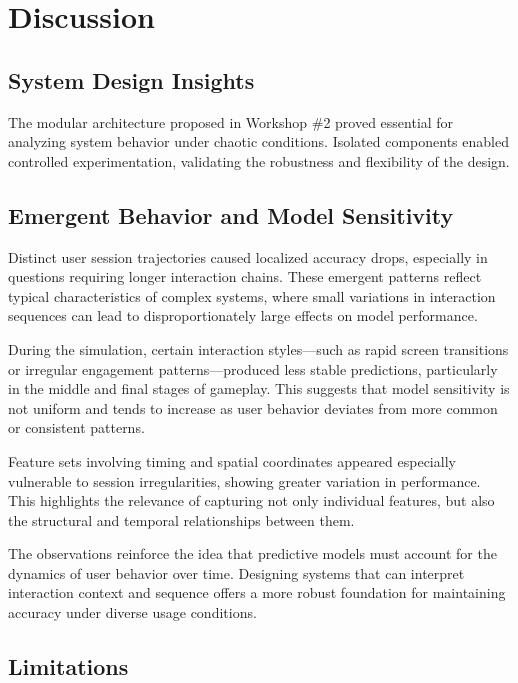 \documentclass[12pt]{article}
\begin{document}
\section{Discussion}

\subsection{System Design Insights}

The modular architecture proposed in Workshop \#2 proved essential for analyzing system behavior under chaotic conditions. Isolated components enabled controlled experimentation, validating the robustness and flexibility of the design.

\subsection{Emergent Behavior and Model Sensitivity}

Distinct user session trajectories caused localized accuracy drops, especially in questions requiring longer interaction chains. These emergent patterns reflect typical characteristics of complex systems, where small variations in interaction sequences can lead to disproportionately large effects on model performance.

During the simulation, certain interaction styles—such as rapid screen transitions or irregular engagement patterns—produced less stable predictions, particularly in the middle and final stages of gameplay. This suggests that model sensitivity is not uniform and tends to increase as user behavior deviates from more common or consistent patterns.

Feature sets involving timing and spatial coordinates appeared especially vulnerable to session irregularities, showing greater variation in performance. This highlights the relevance of capturing not only individual features, but also the structural and temporal relationships between them.

The observations reinforce the idea that predictive models must account for the dynamics of user behavior over time. Designing systems that can interpret interaction context and sequence offers a more robust foundation for maintaining accuracy under diverse usage conditions.



\subsection{Limitations}
\end{document}
